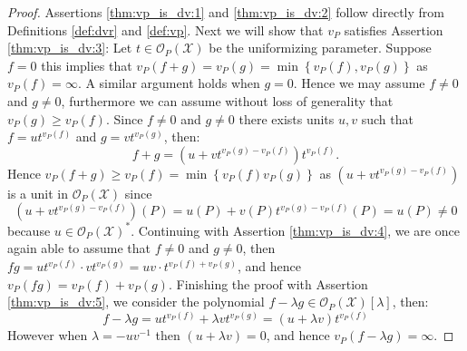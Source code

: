 \begin{proof}
  Assertions \ref{thm:vp_is_dv:1} and \ref{thm:vp_is_dv:2} follow directly from Definitions \ref{def:dvr} and \ref{def:vp}. Next we will show that $v_P$ satisfies Assertion \ref{thm:vp_is_dv:3}:
  Let $t \in \mathcal{O}_{P}(\mathcal{X})$ be the uniformizing parameter. Suppose $f = 0$ this implies that $v_{P}(f + g) = v_{P}(g) = \min \left\{v_{P}(f), v_{P}(g)\right\}$ as $v_{P}(f) = \infty$. A similar argument holds when $g = 0$.
  Hence we may assume $f \neq 0$ and $g \neq 0$, furthermore we can assume without loss of generality that $v_{P}(g) \geq v_{P}(f)$. Since $f \neq 0$ and $g \neq 0$ there exists units $u, v$ such that $f = u t^{v_{P}(f)}$ and $g = v t^{v_{P}(g)}$, then:
  \begin{equation*}
    f + g = (u + v t^{v_{P}(g) - v_{P}(f)}) t^{v_P(f)}.
  \end{equation*}
  Hence $v_{P}(f + g) \geq v_{P}(f) = \min \left\{v_{P}(f) v_P(g)\right\}$ as $(u + v t^{v_P(g) - v_P(f)})$ is a unit in $\mathcal{O}_P(\mathcal{X})$ since
  \begin{equation*}
    (u + v t^{v_P(g) - v_P(f)})(P) = u(P) + v(P) t^{v_{P}(g) - v_P(f)}(P) = u(P) \neq 0
  \end{equation*}
  because $u \in \mathcal{O}_{P}(\mathcal{X})^{*}$. Continuing with Assertion \ref{thm:vp_is_dv:4}, we are once again able to assume that $f \neq 0$ and $g \neq 0$, then $fg = u t^{v_{P}(f)} \cdot v t^{v_{P}(g)} = u v \cdot t^{v_{P}(f) + v_{P}(g)}$, and hence $v_{P}(fg) = v_{P}(f) + v_{P}(g)$. Finishing the proof with Assertion \ref{thm:vp_is_dv:5}, we consider the polynomial $f - \lambda g \in \mathcal{O}_{P}(\mathcal{X})[\lambda]$, then:
  \begin{equation*}
    f - \lambda g = u t^{v_{P}(f)} + \lambda vt^{v_P(g)} = (u + \lambda v) t^{v_{P}(f)}
  \end{equation*}
  However when $\lambda = -uv^{-1}$ then $(u + \lambda v) = 0$, and hence $v_{P}(f - \lambda g) = \infty$.
\end{proof}
\newpage
